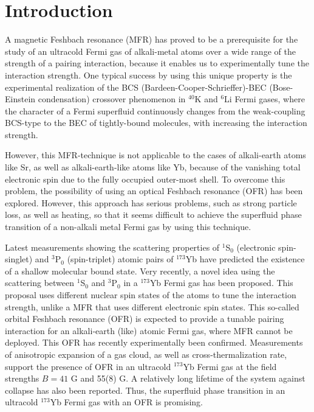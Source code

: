 \documentclass[a4paper]{jpconf}
\begin{document}
\section{Introduction}
\par
A magnetic Feshbach resonance (MFR) has proved to be a prerequisite for the study of an ultracold Fermi gas of alkali-metal atoms over a wide range of the strength of a pairing interaction, because it enables us to experimentally tune the interaction strength\cite{Chin}. One typical success by using this unique property is the experimental realization of the BCS (Bardeen-Cooper-Schrieffer)-BEC (Bose-Einstein condensation) crossover phenomenon\cite{NSR,Randeria,Ohashi} in $^{40}$K\cite{Jin} and $^6$Li\cite{Zwierlein} Fermi gases, where the character of a Fermi superfluid continuously changes from the weak-coupling BCS-type to the BEC of tightly-bound molecules, with increasing the interaction strength. 
\par
However, this MFR-technique is not applicable to the cases of alkali-earth atoms like Sr, as well as alkali-earth-like atoms like Yb, because of the vanishing total electronic spin due to the fully occupied outer-most shell. To overcome this problem, the possibility of using an optical Feshbach resonance (OFR) has been explored\cite{Enomoto}. However, this approach has serious problems, such as strong particle loss, as well as heating, so that it seems difficult to achieve the superfluid phase transition of a non-alkali metal Fermi gas by using this technique.
\par
Latest measurements showing the scattering properties of $^1$S$_0$ (electronic spin-singlet) and $^3$P$_0$ (spin-triplet) atomic pairs of $^{173}$Yb have predicted the existence of a shallow molecular bound state\cite{Bloch,Inguscio}. Very recently, a novel idea using the scattering between $^1$S$_0$ and $^3$P$_0$ in a $^{173}$Yb Fermi gas has been proposed\cite{Zhang}. This proposal uses different nuclear spin states of the atoms to tune the interaction strength, unlike a MFR that uses different electronic spin states. This so-called orbital Feshbach resonance (OFR) is expected to provide a tunable pairing interaction for an alkali-earth (like) atomic Fermi gas, where MFR cannot be deployed.  This OFR has recently experimentally been confirmed\cite{Inguscio2,Bloch2}. Measurements of anisotropic expansion of a gas cloud, as well as cross-thermalization rate, support the presence of OFR in an ultracold $^{173}$Yb Fermi gas at the field strengths $B=41$ G and 55(8) G. A relatively long lifetime of the system against collapse has also been reported\cite{Inguscio2,Bloch2}. Thus, the superfluid phase transition in an ultracold $^{173}$Yb Fermi gas with an OFR is promising.
\end{document}

